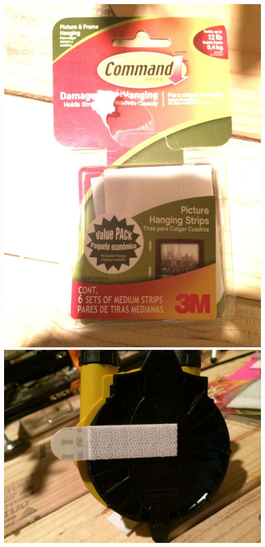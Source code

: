 \documentclass[12pt]{article}
\begin{document}
\newpage
\includegraphics[scale=0.1,angle=270]{images/volume_analysis_setup/IMG_0613.JPG}
\newpage
\includegraphics[scale=0.1,angle=270]{images/volume_analysis_setup/IMG_0611.JPG}
\end{document}
